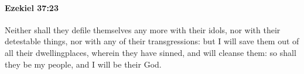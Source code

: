 
		\paragraph{Ezekiel 37:23} %
			\label{EZEKIEL-37-23}

			Neither shall they defile themselves any more with their idols, nor with their detestable things, nor with any of their transgressions: but I will save them out of all their dwellingplaces, wherein they have sinned, and will cleanse them: so shall they be my people, and I will be their God.


